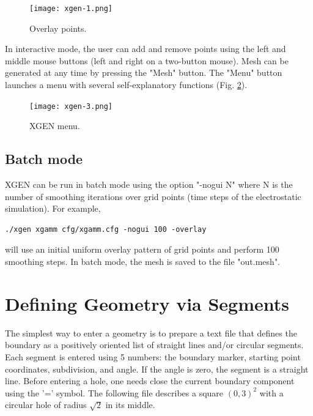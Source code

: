 \documentclass[12pt]{article}
\begin{document}
\newpage

  \begin{figure}[!ht]
  \begin{center}
  \texttt{[image: xgen-1.png]}
  \end{center}
  \vspace{-6mm}
  \caption{Overlay points.}
  \label{fig:overlay}
  \end{figure}
\noindent 
  In interactive mode, the user can add and remove points using the left and middle  
  mouse buttons (left and right on a two-button mouse). 
  Mesh can be generated at any time by pressing the "Mesh" button.
  The "Menu" button launches a menu with several self-explanatory functions
  (Fig. \ref{fig:menu}). 

  \begin{figure}[!ht]
  \begin{center}
  \texttt{[image: xgen-3.png]}
  \end{center}
  \vspace{-6mm}
  \caption{XGEN menu.}
  \label{fig:menu}
  \end{figure}

\subsection{Batch mode}

XGEN can be run in batch mode using the option "-nogui N" where N is the number 
of smoothing iterations over grid points (time steps of the electrostatic 
simulation). For example, 

\begin{verbatim}
./xgen xgamm cfg/xgamm.cfg -nogui 100 -overlay
\end{verbatim}

\noindent
will use an initial uniform overlay pattern of grid points and 
perform 100 smoothing steps. In batch mode, the mesh is saved to 
the file "out.mesh".

  \section{Defining Geometry via Segments}

  The simplest way to enter a geometry is to prepare a text file 
  that defines the boundary as a positively oriented list of 
  straight lines and/or circular segments. Each segment is 
  entered using 5 numbers: the boundary marker, starting 
  point coordinates, subdivision, and angle. If the angle is zero, the segment
  is a straight line. Before entering a hole, one needs close the
  current boundary component using the '=' symbol. The following 
  file describes a square $(0, 3)^2$ with a circular hole of
  radius $\sqrt{2}$ in its middle. 
\end{document}
